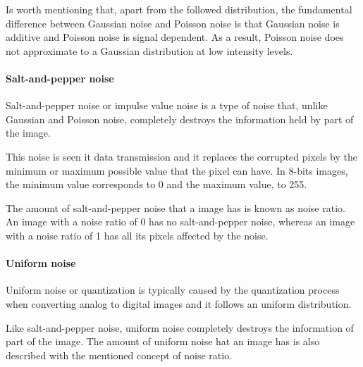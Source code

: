 Is worth mentioning that, apart from the followed distribution, the fundamental difference between Gaussian noise and Poisson noise is that Gaussian noise is additive and Poisson noise is signal dependent. As a result, Poisson noise does not approximate to a Gaussian distribution at low intensity levels.

\paragraph{Salt-and-pepper noise}
Salt-and-pepper noise or impulse value noise is a type of noise that, unlike Gaussian and Poisson noise, completely destroys the information held by part of the image. 

This noise is seen it data transmission and it replaces the corrupted pixels by the minimum or maximum possible value that the pixel can have. In 8-bits images, the minimum value corresponds to 0 and the maximum value, to 255.

The amount of salt-and-pepper noise that a image has is known as noise ratio. An image with a noise ratio of 0 has no salt-and-pepper noise, whereas an image with a noise ratio of 1 has all its pixels affected by the noise.

\paragraph{Uniform noise}
Uniform noise or quantization is typically caused by the quantization process when converting analog to digital images and it follows an uniform distribution. 

Like salt-and-pepper noise, uniform noise completely destroys the information of part of the image. The amount of uniform noise hat an image has is also described with the mentioned concept of noise ratio.

